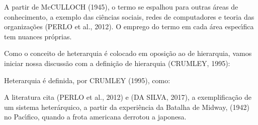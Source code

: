 \documentclass[
12pt,		%
openright,	%
twoside,  %
a4paper,			%
chapter=TITLE,		%
english,			%
french,				%
spanish,			%
brazil				%
]{USPSC-classe/USPSC}
\begin{document}
A partir de  McCULLOCH (1945), o termo se espalhou para outras \'areas de conhecimento, a exemplo das ci\^encias sociais, redes de computadores e teoria das organiza\c{c}\~oes  (PERLO et al., 2012). O emprego do termo em cada \'area espec\'{\i}fica tem nuances pr\'oprias.

















Como o conceito de heterarquia \'e colocado em oposi\c{c}\~ao ao de hierarquia, vamos iniciar nossa discuss\~ao com a defini\c{c}\~ao de hierarquia (CRUMLEY, 1995):


















\noindent\begin{center}\mbox{\centering{}}\end{center}


Heterarquia \'e definida, por  CRUMLEY (1995), como:


















\noindent\begin{center}\mbox{\centering{}}\end{center}


A literatura cita (PERLO et al., 2012) e (DA SILVA, 2017), a exemplifica\c{c}\~ao de um sistema heter\'arquico, a partir da experi\^encia da Batalha de Midway, (1942) no Pac\'{\i}fico, quando a frota americana derrotou a japonesa.
\end{document}
